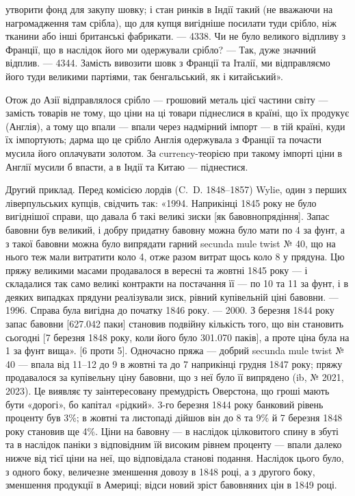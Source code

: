 \parcont{}  %
утворити фонд для закупу шовку; і стан ринків в Індії такий (не вважаючи на
нагромадження там срібла), що для купця вигідніше посилати туди срібло, ніж
тканини або інші британські фабрикати. — 4338. Чи не було великого відпливу
з Франції, що в наслідок його ми одержували срібло? — Так, дуже значний відплив.
— 4344. Замість вивозити шовк з Франції та Італії, ми відправляємо його
туди великими партіями, так бенгальський, як і китайський».

Отож до Азії відправлялося срібло — грошовий металь цієї частини світу —
замість товарів не тому, що ціни на ці товари піднеслися в країні, що їх продукує
(Англія), а тому що впали — впали через надмірний імпорт — в тій країні,
куди їх імпортують; дарма що це срібло Англія одержувала з Франції та почасти
мусила його оплачувати золотом. За currency-теорією при такому імпорті
ціни в Англії мусили б впасти, а в Індії та Китаю — піднестися.

Другий приклад. Перед комісією лордів (C.~D. 1848--1857) Wylie, один
з перших ліверпульських купців, свідчить так: «1994. Наприкінці 1845 року
не було вигіднішої справи, що давала б такі великі зиски [як бавовнопрядіння].
Запас бавовни був великий, і добру придатну бавовну можна було мати по
4 за фунт, а з такої бавовни можна було випрядати гарний secunda
mule twist № 40, що на нього теж мали витратити коло 4, отже разом
витрат щось коло 8 у прядуна. Цю пряжу великими масами продавалося
в вересні та жовтні 1845 року — і складалися так само великі контракти на
постачання її — по 10 та 11 за фунт, і в деяких випадках прядуни
реалізували зиск, рівний купівельній ціні бавовни. — 1996. Справа була вигідна
до початку 1846 року. — 2000. З березня 1844 року запас бавовни [\num{627.042} паки]
становив подвійну кількість того, що він становить сьогодні [7 березня 1848 року,
коли його було \num{301.070} паків], а проте ціна була на 1 за фунт вища».
[6 проти 5]. Одночасно пряжа — добрий secunda mule twist
№ 40 — впала від 11--12 до 9 в жовтні та до 7
наприкінці грудня 1847 року; пряжу продавалося за купівельну ціну бавовни,
що з неї було її випрядено (ib, № 2021, 2023). Це виявляє ту заінтересовану
премудрість Оверстона, що гроші мають бути «дорогі», бо капітал «рідкий». 3-го березня
1844 року банковий рівень проценту був 3\%; в жовтні та листопаді
дійшов він до 8 та 9\% й 7 березня 1848 року становив ще 4\%. Ціни на бавовну
— в наслідок цілковитого спину в збуті та в наслідок паніки з відповідним
їй високим рівнем проценту — впали далеко нижче від тієї ціни на неї,
що відповідала станові подання. Наслідок цього було, з одного боку, величезне
зменшення довозу в 1848 році, а з другого боку, зменшення продукції в Америці;
відси новий зріст бавовняних цін в 1849 році.

